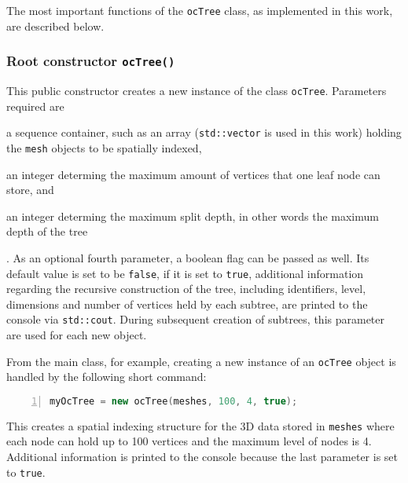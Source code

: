 The most important functions of the \texttt{ocTree} class, as implemented in this work, are described below.

\subsubsection{Root constructor \texttt{ocTree()}}
\label{sec:root_constructor}
	This public constructor creates a new instance of the class \texttt{ocTree}. Parameters required are
	\begin{enumerate*}
		\item a sequence container, such as an array (\texttt{std::vector} is used in this work) holding the \texttt{mesh} objects to be spatially indexed,
		\item an integer determing the maximum amount of vertices that one leaf node can store, and
		\item an integer determing the maximum split depth, in other words the maximum depth of the tree
	\end{enumerate*}.
	As an optional fourth parameter, a boolean flag can be passed as well. Its default value is set to be \texttt{false}, if it is set to \texttt{true}, additional information regarding the recursive construction of the tree, including identifiers, level, dimensions and number of vertices held by each subtree, are printed to the console via \texttt{std::cout}. During subsequent creation of subtrees, this parameter are used for each new object.

From the main class, for example, creating a new instance of an \texttt{ocTree} object is handled by the following short command:

\begin{minipage}{\linewidth}
\begin{lstlisting}[language=C++,numberstyle=\zebra{black!5}{white}{},numbers=left,xleftmargin=2em,tabsize=3]
myOcTree = new ocTree(meshes, 100, 4, true);
\end{lstlisting}
\end{minipage}

This creates a spatial indexing structure for the 3D data stored in \texttt{meshes} where each node can hold up to 100 vertices and the maximum level of nodes is 4. Additional information is printed to the console because the last parameter is set to \texttt{true}.

